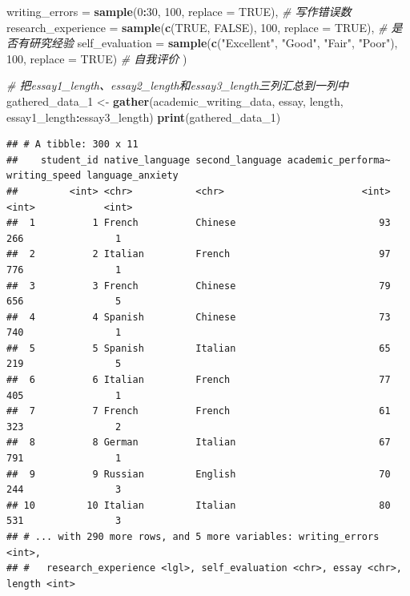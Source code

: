 \documentclass[]{book}
\newenvironment{Shaded}{\begin{snugshade}}{\end{snugshade}}
\newcommand{\CommentTok}[1]{\textcolor[rgb]{0.56,0.35,0.01}{\textit{#1}}}
\newcommand{\DataTypeTok}[1]{\textcolor[rgb]{0.13,0.29,0.53}{#1}}
\newcommand{\DecValTok}[1]{\textcolor[rgb]{0.00,0.00,0.81}{#1}}
\newcommand{\KeywordTok}[1]{\textcolor[rgb]{0.13,0.29,0.53}{\textbf{#1}}}
\newcommand{\NormalTok}[1]{#1}
\newcommand{\OperatorTok}[1]{\textcolor[rgb]{0.81,0.36,0.00}{\textbf{#1}}}
\newcommand{\OtherTok}[1]{\textcolor[rgb]{0.56,0.35,0.01}{#1}}
\newcommand{\StringTok}[1]{\textcolor[rgb]{0.31,0.60,0.02}{#1}}
\begin{document}
\begin{Shaded}
\begin{Highlighting}[]
  \DataTypeTok{writing_errors =} \KeywordTok{sample}\NormalTok{(}\DecValTok{0}\OperatorTok{:}\DecValTok{30}\NormalTok{, }\DecValTok{100}\NormalTok{, }\DataTypeTok{replace =} \OtherTok{TRUE}\NormalTok{),  }\CommentTok{# 写作错误数}
  \DataTypeTok{research_experience =} \KeywordTok{sample}\NormalTok{(}\KeywordTok{c}\NormalTok{(}\OtherTok{TRUE}\NormalTok{, }\OtherTok{FALSE}\NormalTok{), }\DecValTok{100}\NormalTok{, }\DataTypeTok{replace =} \OtherTok{TRUE}\NormalTok{),  }\CommentTok{# 是否有研究经验}
  \DataTypeTok{self_evaluation =} \KeywordTok{sample}\NormalTok{(}\KeywordTok{c}\NormalTok{(}\StringTok{"Excellent"}\NormalTok{, }\StringTok{"Good"}\NormalTok{, }\StringTok{"Fair"}\NormalTok{, }\StringTok{"Poor"}\NormalTok{), }\DecValTok{100}\NormalTok{, }\DataTypeTok{replace =} \OtherTok{TRUE}\NormalTok{)  }\CommentTok{# 自我评价}
\NormalTok{)}
\end{Highlighting}
\end{Shaded}

\begin{Shaded}
\begin{Highlighting}[]
\CommentTok{# 把essay1_length、essay2_length和essay3_length三列汇总到一列中}
\NormalTok{gathered_data_}\DecValTok{1}\NormalTok{ <-}\StringTok{ }\KeywordTok{gather}\NormalTok{(academic_writing_data, essay, length, essay1_length}\OperatorTok{:}\NormalTok{essay3_length)}
\KeywordTok{print}\NormalTok{(gathered_data_}\DecValTok{1}\NormalTok{)}
\end{Highlighting}
\end{Shaded}

\begin{verbatim}
## # A tibble: 300 x 11
##    student_id native_language second_language academic_performa~ writing_speed language_anxiety
##         <int> <chr>           <chr>                        <int>         <int>            <int>
##  1          1 French          Chinese                         93           266                1
##  2          2 Italian         French                          97           776                1
##  3          3 French          Chinese                         79           656                5
##  4          4 Spanish         Chinese                         73           740                1
##  5          5 Spanish         Italian                         65           219                5
##  6          6 Italian         French                          77           405                1
##  7          7 French          French                          61           323                2
##  8          8 German          Italian                         67           791                1
##  9          9 Russian         English                         70           244                3
## 10         10 Italian         Italian                         80           531                3
## # ... with 290 more rows, and 5 more variables: writing_errors <int>,
## #   research_experience <lgl>, self_evaluation <chr>, essay <chr>, length <int>
\end{verbatim}
\end{document}
